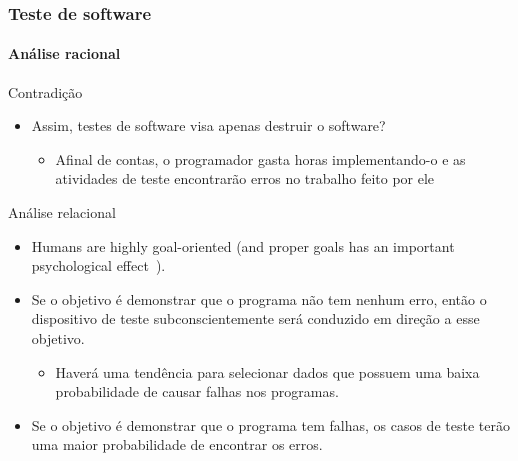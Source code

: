 \begin{frame}
\frametitle{Teste de software}
\framesubtitle{Análise racional}

\begin{block:fact}{Contradição}
\begin{itemize}
	\item Assim, testes de software visa apenas destruir o software?
	\begin{itemize}
		\item Afinal de contas, o programador gasta horas implementando-o e as atividades de teste encontrarão erros no trabalho feito por ele
	\end{itemize}
\end{itemize}
\end{block:fact}

\begin{block:fact}{Análise relacional}
\begin{itemize}
	\item {\small Humans are highly goal-oriented (and proper goals has an important
	psychological effect~\cite[p. 6]{myers:2004}).} %

	\item {\small Se o objetivo é demonstrar que o programa não tem nenhum erro, então o dispositivo de teste subconscientemente será conduzido em direção a esse objetivo.}
	\begin{itemize}
		\item{\small Haverá uma tendência para selecionar dados que possuem uma baixa probabilidade de causar falhas nos programas.}
	\end{itemize}

	\item {\small Se o objetivo é demonstrar que o programa tem falhas, os casos de teste terão uma maior probabilidade de encontrar os erros.}
\end{itemize}
\end{block:fact}
\end{frame}



